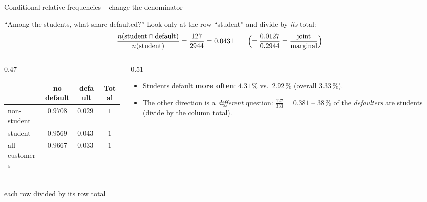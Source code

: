 \documentclass[aspectratio=169,11pt]{beamer}
\begin{document}
\begin{frame}{Conditional relative frequencies -- change the denominator}
  \begin{block}{``Among the students, what share defaulted?''}
    Look only at the row ``student'' and divide by \emph{its} total:
    \[
      \frac{n(\text{student}\cap\text{default})}{n(\text{student})}
      =\frac{127}{2944}=0.0431
      \qquad\Bigl(=\frac{0.0127}{0.2944}=\frac{\text{joint}}{\text{marginal}}\Bigr)
    \]
  \end{block}
  \begin{columns}[c]
    \begin{column}{0.47\textwidth}
      \centering
      \renewcommand{\arraystretch}{1.12}
      \begin{tabular}{@{}l|cc|c@{}}
        \toprule
        & no default & default & Total\\
        \midrule
        non-student & $0.9708$ & $\mathbf{0.0292}$ & $1$\\
        student & $0.9569$ & $\mathbf{0.0431}$ & $1$\\
        \midrule
        all customers & $0.9667$ & $0.0333$ & $1$\\
        \bottomrule
      \end{tabular}\\[1pt]
      {\footnotesize each row divided by its row total}
    \end{column}
    \begin{column}{0.51\textwidth}
      \small
      \begin{itemize}\setlength{\itemsep}{3pt}
        \item Students default \textbf{more often}: $4.31\,\%$ vs.\ $2.92\,\%$
              (overall $3.33\,\%$).
        \item The other direction is a \emph{different} question:
              $\frac{127}{333}=0.381$ -- $38\,\%$ of the \emph{defaulters}
              are students (divide by the column total).
      \end{itemize}
    \end{column}
  \end{columns}
  \smallskip
\end{frame}
\end{document}
